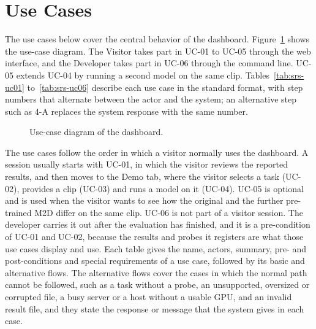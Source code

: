 \documentclass{FastFyp}
\begin{document}
\section{Use Cases}
\label{sec:srs-usecases}
The use cases below cover the central behavior of the dashboard. Figure~\ref{fig:srs-ucd} shows the use-case diagram. The Visitor takes part in UC-01 to UC-05 through the web interface, and the Developer takes part in UC-06 through the command line. UC-05 extends UC-04 by running a second model on the same clip. Tables~\ref{tab:srs-uc01} to~\ref{tab:srs-uc06} describe each use case in the standard format, with step numbers that alternate between the actor and the system; an alternative step such as 4-A replaces the system response with the same number.

\begin{figure}[htbp]
\centering
\singlespacing
{}
\caption[Use-case diagram of the dashboard]{Use-case diagram of the dashboard.}
\label{fig:srs-ucd}
\end{figure}

The use cases follow the order in which a visitor normally uses the dashboard. A session usually starts with UC-01, in which the visitor reviews the reported results, and then moves to the Demo tab, where the visitor selects a task (UC-02), provides a clip (UC-03) and runs a model on it (UC-04). UC-05 is optional and is used when the visitor wants to see how the original and the further pre-trained M2D differ on the same clip. UC-06 is not part of a visitor session. The developer carries it out after the evaluation has finished, and it is a pre-condition of UC-01 and UC-02, because the results and probes it registers are what those use cases display and use. Each table gives the name, actors, summary, pre- and post-conditions and special requirements of a use case, followed by its basic and alternative flows. The alternative flows cover the cases in which the normal path cannot be followed, such as a task without a probe, an unsupported, oversized or corrupted file, a busy server or a host without a usable GPU, and an invalid result file, and they state the response or message that the system gives in each case.
\end{document}
